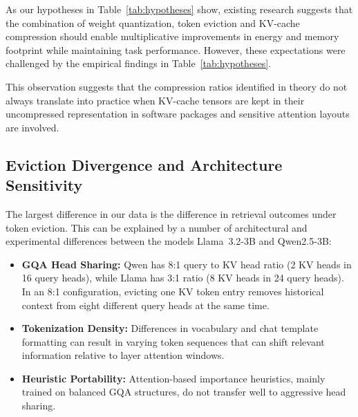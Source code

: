 \documentclass[sigconf,nonacm]{acmart}
\begin{document}
As our hypotheses in Table~\ref{tab:hypotheses} show, existing research suggests that the combination of weight quantization, token eviction and KV-cache compression should enable multiplicative improvements in energy and memory footprint while maintaining task performance. However, these expectations were challenged by the empirical findings in Table~\ref{tab:hypotheses}.



\begin{table}[htbp]
\caption{Initial Expectations versus Empirical Findings}
\label{tab:hypotheses}
\centering\small
{}
\end{table}

This observation suggests that the compression ratios identified in theory do not always translate into practice when KV-cache tensors are kept in their uncompressed representation in software packages and sensitive attention layouts are involved.

\subsection{Eviction Divergence and Architecture Sensitivity}

The largest difference in our data is the difference in retrieval outcomes under token eviction. This can be explained by a number of architectural and experimental differences between the models Llama~3.2-3B and Qwen2.5-3B:
\begin{itemize}
  \item \textbf{GQA Head Sharing:} Qwen has 8:1 query to KV head ratio (2 KV heads in 16 query heads), while Llama has 3:1 ratio (8 KV heads in 24 query heads). In an 8:1 configuration, evicting one KV token entry removes historical context from eight different query heads at the same time.
  \item \textbf{Tokenization Density:} Differences in vocabulary and chat template formatting can result in varying token sequences that can shift relevant information relative to layer attention windows.
 \item \textbf{Heuristic Portability:} Attention-based importance heuristics, mainly trained on balanced GQA structures, do not transfer well to aggressive head sharing.
\end{itemize}
\end{document}
